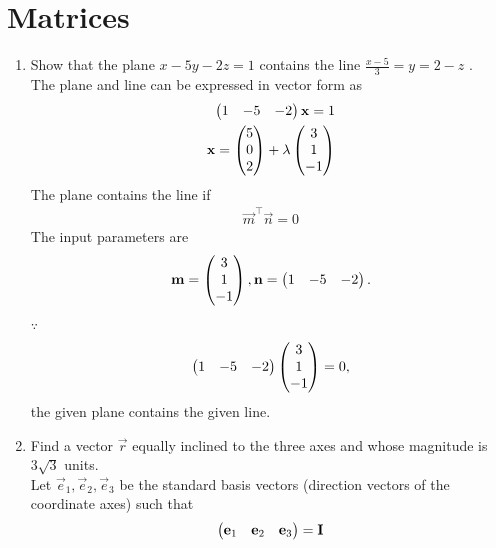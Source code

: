 \documentclass[journal,12pt,twocolumn]{IEEEtran}
\renewcommand\thesection{\arabic{section}}
\begin{document}
\newpage

\tableofcontents

\bigskip

\renewcommand{\thefigure}{\theenumi}
\renewcommand{\thetable}{\theenumi}
\renewcommand{\theequation}{\theenumi}

\section{Matrices}
\begin{enumerate}[label=\thesection.\arabic*.,ref=\thesection.\theenumi]
\item Show that the plane $ x-5y-2z=1 $ contains the line $ \frac{x-5}{3}=y=2-z $ .\\
	\solution The plane and line can be expressed in vector form as
  \begin{align}
	  \label{eq:line_plane_contain_plane}
	  \begin{pmatrix}1 & -5 & -2\end{pmatrix}\mathbf{x}=1 
	  \\
	  \mathbf{x} = \begin{pmatrix}5 \\ 0 \\ 2\end{pmatrix} + \lambda \begin{pmatrix}3 \\ 1 \\ -1\end{pmatrix}
	  \label{eq:line_plane_containline}
  \end{align}
The plane contains the line if 
  \begin{align}
	  \vec{m}^{\top}\vec{n} = 0
  \end{align}
  The input parameters are 
  \begin{align}
	  \mathbf{m} = \begin{pmatrix}3 \\ 1 \\ -1\end{pmatrix},
	 \mathbf{n} = \begin{pmatrix}1 & -5 & -2\end{pmatrix}.
  \end{align}
  $\because$
  \begin{align}
	  \begin{pmatrix}1 & -5 & -2\end{pmatrix}\begin{pmatrix}3 \\ 1 \\ -1\end{pmatrix} = 0,
	  \label{eq:line_plane_containline_sol}
  \end{align}
the given plane contains the given line.
\item  Find a vector $\overrightarrow{r}$ equally inclined to the three axes and whose magnitude is $3\sqrt{3}$ units.   
	\\
	\solution  Let $\vec{e}_1, \vec{e}_2, \vec{e}_3$ be the standard basis vectors (direction vectors of the coordinate axes) such that
  \begin{align}
	  \myvec{\vec{e}_1 & \vec{e}_2 &\vec{e}_3} = \vec{I}

\end{align}
\end{enumerate}
\end{document}
